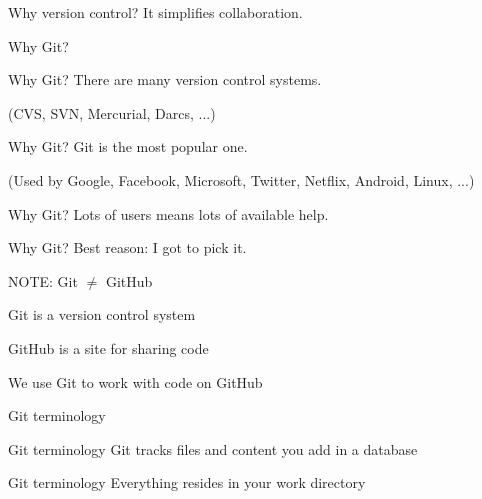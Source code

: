 \documentclass{beamer}
\begin{document}
\begin{frame}{Why version control?}
  \center
  \Huge It simplifies collaboration.
\end{frame}

\begin{frame}{}
  \center
  \Huge Why Git?
\end{frame}

\begin{frame}{Why Git?}
  \center
  \Huge There are many version control systems.
  \pause

  \huge (CVS, SVN, Mercurial, Darcs, ...)
\end{frame}

\begin{frame}{Why Git?}
  \center
  \Huge Git is the most popular one.
  \pause

  \large (Used by Google, Facebook, Microsoft, Twitter, Netflix, Android, Linux, ...)
\end{frame}

\begin{frame}{Why Git?}
  \center
  \Huge Lots of users means lots of available help.
\end{frame}

\begin{frame}{Why Git?}
  \center
  \Huge Best reason: I got to pick it.
\end{frame}

\begin{frame}{}
  \center
  \Huge NOTE: Git $ \neq $ GitHub
  \pause

  \huge Git is a version control system
  \pause

  \huge GitHub is a site for sharing code
\end{frame}

\begin{frame}{}
  \center
  \Huge We use Git to work with code on GitHub
\end{frame}

\begin{frame}{}
  \center
  \Huge Git terminology
\end{frame}

\begin{frame}{Git terminology}
  \center
  \Huge Git tracks files and content you add in a database
\end{frame}

\begin{frame}{Git terminology}
  \center
  \Huge Everything resides in your work directory
\end{frame}
\end{document}
